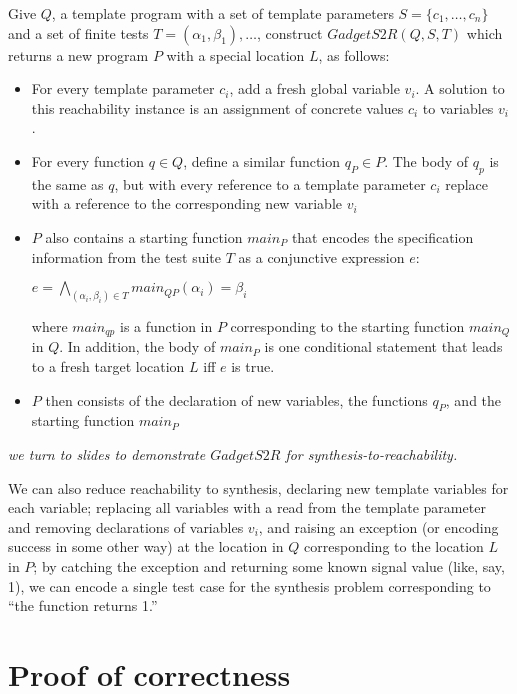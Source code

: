 \documentclass[11pt]{article}
\begin{document}
Give $Q$, a template program with a set of template parameters $S = \{ c_1,
\ldots, c_n\}$ and a set of finite tests $T = {(\alpha_1,\beta_1), \ldots}$,
  construct $GadgetS2R(Q,S,T)$ which returns a new program $P$ with a special
  location $L$, as follows:

\begin{itemize}
\item For every template parameter $c_i$, add a fresh global variable $v_i$.  A
  solution to this reachability instance is an assignment of concrete values
  $c_i$ to variables $v_i$.
\item For every function $q \in Q$, define a similar function $q_{P} \in P$.
  The body of $q_p$ is the same as $q$, but with every reference to a template
  parameter $c_i$ replace with a reference to the corresponding new variable $v_i$
\item $P$ also contains a starting function $main_P$ that encodes the
  specification information from the test suite $T$ as a conjunctive expression
  $e$:

$e = \bigwedge\limits_{(\alpha_i,\beta_i) \in T} main_{QP}(\alpha_i) = \beta_i$

where $main_{qp}$ is a function in $P$ corresponding to the starting function
$main_Q$ in $Q$.  In addition, the body of $main_P$ is one conditional statement that
leads to a fresh target location $L$ iff $e$ is true.  
\item $P$ then consists of the declaration of new variables, the functions
  $q_P$, and the starting function $main_P$
\end{itemize}

\vspace{1ex}
\emph{we turn to slides to demonstrate $GadgetS2R$ for synthesis-to-reachability.}
\vspace{1ex}

We can also reduce reachability to synthesis, declaring new template variables
for each variable; replacing all variables with a read from the template
parameter and removing declarations of variables $v_i$, and raising an exception
(or encoding success in some other way) at the location in $Q$ corresponding to
the location $L$ in $P$; by catching the exception and returning some known
signal value (like, say, 1), we can encode a single test case for the synthesis problem
corresponding to ``the function returns 1.'' 

\section{Proof of correctness}
\end{document}
